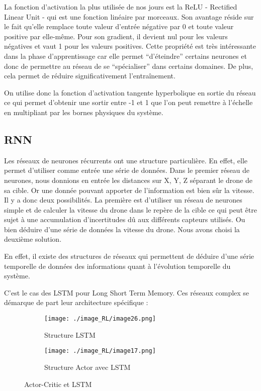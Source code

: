 La fonction d'activation la plus utilisée de nos jours est la ReLU - Rectified Linear Unit - qui est une fonction linéaire par morceaux. Son avantage réside sur le fait qu'elle remplace toute valeur d'entrée négative par 0 et toute valeur positive par elle-même. Pour son gradient, il devient nul pour les valeurs négatives et vaut 1 pour les valeurs positives. Cette propriété est très intéressante dans la phase d'apprentissage car elle permet “d’éteindre” certains neurones et donc de permettre au réseau de se “spécialiser” dans certains domaines. De plus, cela permet de réduire significativement l'entraînement.


On utilise donc la fonction d’activation tangente hyperbolique en sortie du réseau ce qui permet d’obtenir une sortir entre -1 et 1 que l’on peut remettre à l'échelle en multipliant par les bornes physiques du système.

\subsection{RNN}

Les réseaux de neurones récurrents ont une structure particulière. En effet, elle permet d’utiliser comme entrée une série de données. Dans le premier réseau de neurones, nous donnions en entrée les distances sur X, Y, Z séparant le drone de sa cible.
Or une donnée pouvant apporter de l’information est bien sûr la vitesse.
Il y a donc deux possibilités. La première est d'utiliser un réseau de neurones simple et de calculer la vitesse du drone dans le repère de la cible ce qui peut être sujet à une accumulation d’incertitudes dû aux différents capteurs utilisés.
Ou bien déduire d’une série de données la vitesse du drone.
Nous avons choisi la deuxième solution. 

En effet, il existe des structures de réseaux qui permettent de déduire d’une série temporelle de données des informations quant à l’évolution temporelle du système.

C’est le cas des LSTM pour Long Short Term Memory\cite{LSTM}. Ces réseaux complex se démarque de part leur architecture spécifique :

\begin{figure}[H]
    \centering
        \begin{subfigure}[b]{0.45\textwidth}
            \centering
            \texttt{[image: ./image\_RL/image26.png]}
            \caption{Structure LSTM}
        \end{subfigure}
        \hfill
        \begin{subfigure}[b]{0.45\textwidth}
            \centering
            \texttt{[image: ./image\_RL/image17.png]}
            \caption{Structure Actor avec LSTM}
        \end{subfigure}
        \caption{Actor-Critic et LSTM}
\end{figure}

